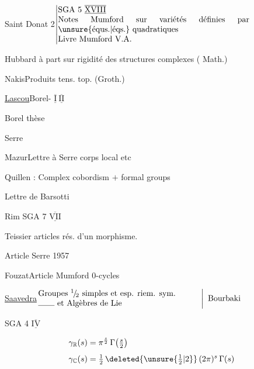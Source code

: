 

Saint Donat 2\qquad \(\left\vert\begin{array}{@{}p{.68\linewidth}@{}}SGA 5 $\overline{\underline{\mathrm{XVIII}}}$\\Notes Mumford sur variétés définies par \unsure{équs.|éqs.} quadratiques\\Livre Mumford V.A.\end{array}\right.\)

Hubbard\qquad {} à part sur rigidité des structures complexes ( Math.)

Nakis\qquad Produits tens. top. (Groth.)

\clearpage

\uline{Lascou}\qquad Borel- $\overline{\underline{\mathrm I}}\ \overline{\underline{\mathrm {II}}}$

Borel thèse

Serre 

Mazur\qquad Lettre à Serre corps  local etc


Quillen : Complex cobordism $+$ formal groups

Lettre de Barsotti

Rim SGA 7 $\overline{\underline{\mathrm{VII}}}$

Teissier articles  rés. d'un morphisme.

\qquad Article Serre 1957

Fouzat\qquad Article Mumford $0$-cycles

\uline{Saavedra}\qquad \(\left.\begin{array}{@{}p{.58\linewidth}@{}}Groupes ${}^{1}\!/\!{}_{2}$ simples et esp. riem. sym.\\\rule{2em}{.35pt} et Algèbres de Lie\end{array}\right\vert\ \text{Bourbaki}\)

SGA 4 $\overline{\underline{\mathrm{IV}}}$

\clearpage


\[
\begin{aligned}
\gamma_{\mathbb{R}}(s)&=\pi^{\frac{s}{2}}\,\Gamma\bigl(\tfrac{s}{2}\bigr)\\[4pt]
\gamma_{\mathbb{C}}(s)&=\tfrac{1}{2}\,\deleted{\unsure{\tfrac{1}{2}|2}}\,(2\pi)^{s}\,\Gamma(s)
\end{aligned}
\]

